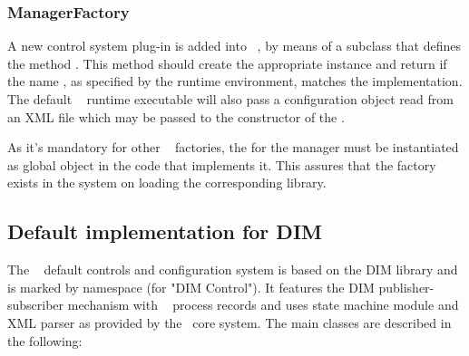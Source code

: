 \subsubsection{ManagerFactory}
 \label{prog_interface_manfactory}
A new control system plug-in is added into \dabc~, 
by means of a  subclass that  
defines the method
.
This method should
create the appropriate  instance and return  
if the name , as specified by the runtime environment,
matches the implementation.
The default \dabc~ runtime executable will also pass 
a configuration object  read from an XML file which may be
passed to the constructor of the .

As it's mandatory for other \dabc~ factories, 
the  for the manager must be
instantiated as global object in the code that implements it.
This assures that the factory exists in the system on
loading the corresponding library.


\subsection{Default implementation for DIM}
The \dabc~ default controls and configuration system 
is based on the DIM library \cite{DIM} and is marked by namespace
 (for "DIM Control"). It features the DIM publisher-subscriber mechanism with \dabc~ process records and uses state machine module and XML parser as provided by the 
\dabc~core system. The main classes are described in the following:


